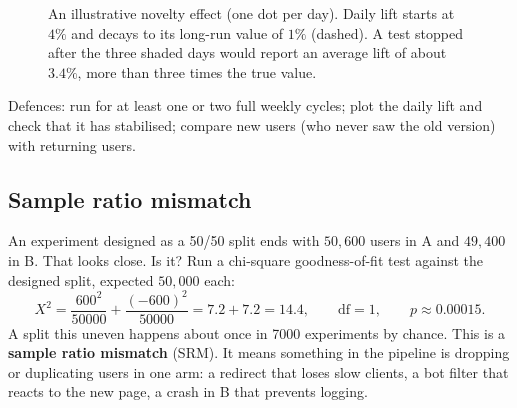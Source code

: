 \begin{figure}[H]
\centering
{}
\caption{An illustrative novelty effect (one dot per day). Daily lift starts at
$4\%$ and decays to its long-run value of $1\%$ (dashed). A test stopped after
the three shaded days would report an average lift of about $3.4\%$, more than
three times the true value.}
\label{fig:cg-novelty}
\end{figure}

Defences: run for at least one or two full weekly cycles; plot the daily lift
and check that it has stabilised; compare new users (who never saw the old
version) with returning users.

\subsection{Sample ratio mismatch}

An experiment designed as a 50/50 split ends with $50{,}600$ users in A and
$49{,}400$ in B. That looks close. Is it? Run a chi-square goodness-of-fit
test against the designed split, expected $50{,}000$ each:
\[
  X^2 = \frac{600^2}{50000} + \frac{(-600)^2}{50000} = 7.2 + 7.2 = 14.4,
  \qquad \text{df} = 1, \qquad p \approx 0.00015.
\]
A split this uneven happens about once in 7000 experiments by chance. This is a
\textbf{sample ratio mismatch} (SRM). It means something in the pipeline is
dropping or duplicating users in one arm: a redirect that loses slow clients,
a bot filter that reacts to the new page, a crash in B that prevents logging.


